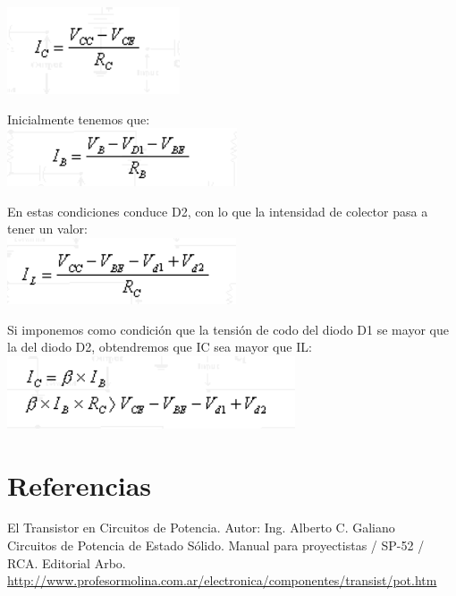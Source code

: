 \documentclass[10pt,a4paper]{article}
\begin{document}
\centering
\includegraphics[scale=.70]{Ic.png}\\
\raggedright 
Inicialmente tenemos que:\\
\centering
\includegraphics[scale=.70]{term.png}\\ 
\raggedright
En estas condiciones conduce D2, con lo que la intensidad de colector pasa a tener un valor:\\
\centering
\includegraphics[scale=.70]{fina.png}\\ 
\raggedright
Si imponemos como condición que la tensión de codo del diodo D1 se mayor que la del diodo D2, obtendremos que IC sea mayor que IL:\\
\centering
\includegraphics[scale=.70]{final.png}\\
\raggedright
\section{Referencias}
El Transistor en Circuitos de Potencia. Autor: Ing. Alberto C. Galiano\\
Circuitos de Potencia de Estado Sólido. Manual para proyectistas / SP-52 / RCA. Editorial Arbo.\\ 
\url{http://www.profesormolina.com.ar/electronica/componentes/transist/pot.htm}
\end{document}
